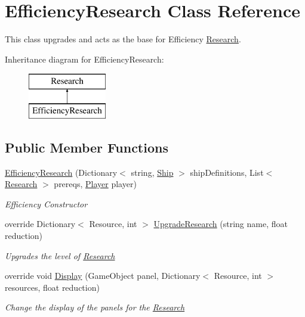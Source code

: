 \hypertarget{class_efficiency_research}{}\section{Efficiency\+Research Class Reference}
\label{class_efficiency_research}


This class upgrades and acts as the base for Efficiency \hyperlink{class_research}{Research}.  


Inheritance diagram for Efficiency\+Research\+:\begin{figure}[H]
\begin{center}
\leavevmode
\includegraphics[height=2.000000cm]{class_efficiency_research}
\end{center}
\end{figure}
\subsection*{Public Member Functions}
\begin{DoxyCompactItemize}
\item 
\hyperlink{class_efficiency_research_a14ed0a9fd251ba16114eb89b1aadf4c3}{Efficiency\+Research} (Dictionary$<$ string, \hyperlink{class_ship}{Ship} $>$ ship\+Definitions, List$<$ \hyperlink{class_research}{Research} $>$ prereqs, \hyperlink{class_player}{Player} player)
\begin{DoxyCompactList}\small\item\em Efficiency Constructor \end{DoxyCompactList}\item 
override Dictionary$<$ Resource, int $>$ \hyperlink{class_efficiency_research_adf0a3b0d4af0e434b6a01d8f6142182b}{Upgrade\+Research} (string name, float reduction)
\begin{DoxyCompactList}\small\item\em Upgrades the level of \hyperlink{class_research}{Research} \end{DoxyCompactList}\item 
override void \hyperlink{class_efficiency_research_ac8caf0085703357f8811ab1989a682ec}{Display} (Game\+Object panel, Dictionary$<$ Resource, int $>$ resources, float reduction)
\begin{DoxyCompactList}\small\item\em Change the display of the panels for the \hyperlink{class_research}{Research} \end{DoxyCompactList}\end{DoxyCompactItemize}
